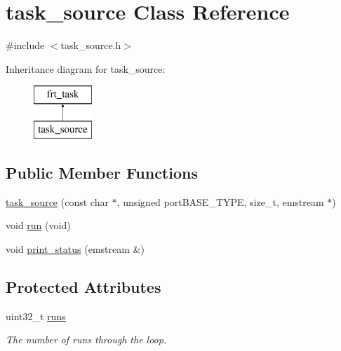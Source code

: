 \hypertarget{classtask__source}{\section{task\+\_\+source Class Reference}
\label{classtask__source}
}


{\ttfamily \#include $<$task\+\_\+source.\+h$>$}

Inheritance diagram for task\+\_\+source\+:\begin{figure}[H]
\begin{center}
\leavevmode
\includegraphics[height=2.000000cm]{classtask__source}
\end{center}
\end{figure}
\subsection*{Public Member Functions}
\begin{DoxyCompactItemize}
\item 
\hyperlink{classtask__source_aae32ac2cf2c64de37e329b660be59c34}{task\+\_\+source} (const char $\ast$, unsigned port\+B\+A\+S\+E\+\_\+\+T\+Y\+P\+E, size\+\_\+t, emstream $\ast$)
\item 
void \hyperlink{classtask__source_a927a4597966476a7616d4d4120b9c43d}{run} (void)
\item 
void \hyperlink{classtask__source_aa44d5bc1d49ea4532b57afbc9d53ad25}{print\+\_\+status} (emstream \&)
\end{DoxyCompactItemize}
\subsection*{Protected Attributes}
\begin{DoxyCompactItemize}
\item 
\hypertarget{classtask__source_adb2e2007c9dc498470637c4fc5444340}{uint32\+\_\+t \hyperlink{classtask__source_adb2e2007c9dc498470637c4fc5444340}{runs}}\label{classtask__source_adb2e2007c9dc498470637c4fc5444340}

\begin{DoxyCompactList}\small\item\em The number of runs through the loop. \end{DoxyCompactList}\end{DoxyCompactItemize}


